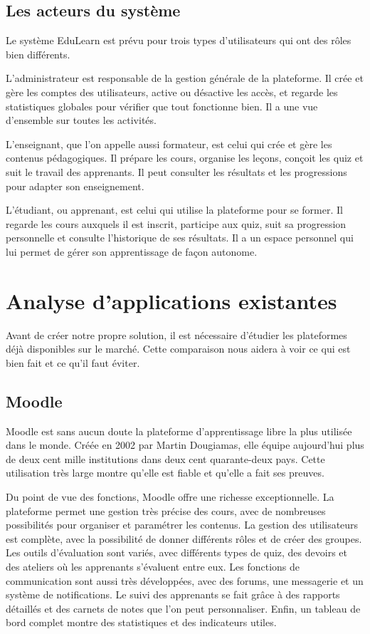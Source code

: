 \documentclass[12pt,a4paper]{report}
\begin{document}
\subsection{Les acteurs du système}
Le système EduLearn est prévu pour trois types d'utilisateurs qui ont des rôles bien différents.

L'administrateur est responsable de la gestion générale de la plateforme. Il crée et gère les comptes des utilisateurs, active ou désactive les accès, et regarde les statistiques globales pour vérifier que tout fonctionne bien. Il a une vue d'ensemble sur toutes les activités.

L'enseignant, que l'on appelle aussi formateur, est celui qui crée et gère les contenus pédagogiques. Il prépare les cours, organise les leçons, conçoit les quiz et suit le travail des apprenants. Il peut consulter les résultats et les progressions pour adapter son enseignement.

L'étudiant, ou apprenant, est celui qui utilise la plateforme pour se former. Il regarde les cours auxquels il est inscrit, participe aux quiz, suit sa progression personnelle et consulte l'historique de ses résultats. Il a un espace personnel qui lui permet de gérer son apprentissage de façon autonome.

\section{Analyse d'applications existantes}
Avant de créer notre propre solution, il est nécessaire d'étudier les plateformes déjà disponibles sur le marché. Cette comparaison nous aidera à voir ce qui est bien fait et ce qu'il faut éviter.

\subsection{Moodle}
Moodle est sans aucun doute la plateforme d'apprentissage libre la plus utilisée dans le monde. Créée en 2002 par Martin Dougiamas, elle équipe aujourd'hui plus de deux cent mille institutions dans deux cent quarante-deux pays. Cette utilisation très large montre qu'elle est fiable et qu'elle a fait ses preuves.

Du point de vue des fonctions, Moodle offre une richesse exceptionnelle. La plateforme permet une gestion très précise des cours, avec de nombreuses possibilités pour organiser et paramétrer les contenus. La gestion des utilisateurs est complète, avec la possibilité de donner différents rôles et de créer des groupes. Les outils d'évaluation sont variés, avec différents types de quiz, des devoirs et des ateliers où les apprenants s'évaluent entre eux. Les fonctions de communication sont aussi très développées, avec des forums, une messagerie et un système de notifications. Le suivi des apprenants se fait grâce à des rapports détaillés et des carnets de notes que l'on peut personnaliser. Enfin, un tableau de bord complet montre des statistiques et des indicateurs utiles.
\end{document}
